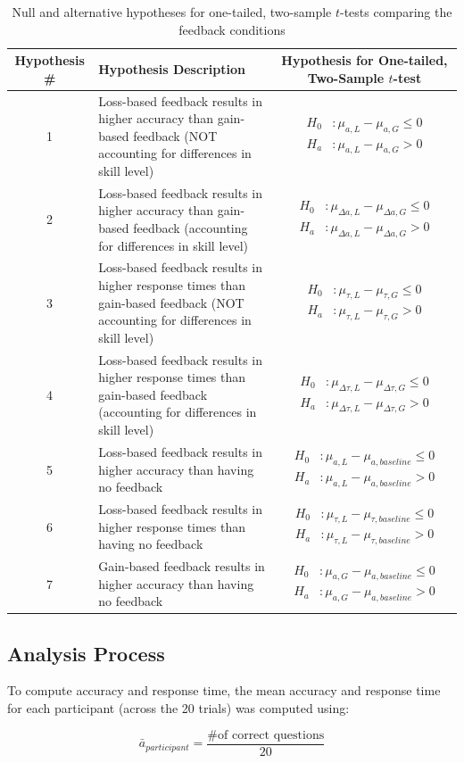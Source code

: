 \documentclass[12pt]{exam}
\newcommand{\onesidedhyp}[1]{
\begin{matrix}
H_0 &: #1 \le 0 \\
H_a &: #1 > 0
\end{matrix}
}
\begin{document}
\begin{table}[H]
    \centering
    \caption{Null and alternative hypotheses for one-tailed, two-sample $t$-tests comparing the feedback conditions}
    \begin{tabular}{|c|p{6cm}|c|}
        \hline
        Hypothesis \# & Hypothesis Description & Hypothesis for One-tailed, Two-Sample $t$-test \\
        \hline
        1 & Loss-based feedback results in higher accuracy than gain-based feedback (NOT accounting for differences in skill level) & $\onesidedhyp{\mu_{a,L} - \mu_{a,G}}$ \\ 
        \hline
        2 & Loss-based feedback results in higher accuracy than gain-based feedback (accounting for differences in skill level) & $\onesidedhyp{\mu_{\Delta a,L} - \mu_{\Delta a,G}}$ \\ 
        \hline
        3 & Loss-based feedback results in higher response times than gain-based feedback (NOT accounting for differences in skill level) & $\onesidedhyp{\mu_{\tau,L} - \mu_{\tau,G}}$ \\ 
        \hline
        4 & Loss-based feedback results in higher response times than gain-based feedback (accounting for differences in skill level) & $\onesidedhyp{\mu_{\Delta \tau,L} - \mu_{\Delta \tau,G}}$\\ 
        \hline
        5 & Loss-based feedback results in higher accuracy than having no feedback & $\onesidedhyp{\mu_{a,L}-\mu_{a,baseline}}$\\ 
        \hline
        6 & Loss-based feedback results in higher response times than having no feedback & $\onesidedhyp{\mu_{\tau,L}-\mu_{\tau,baseline}}$\\ 
        \hline
        7 & Gain-based feedback results in higher accuracy than having no feedback & $\onesidedhyp{\mu_{a,G}-\mu_{a,baseline}}$\\ 
        \hline
    \end{tabular}
    \label{tab:hypotheses}
\end{table}

\subsection{Analysis Process}
To compute accuracy and response time, the mean accuracy and response time for each participant (across the 20 trials) was computed using:

\begin{equation}
    \label{eq:participant-accuracy}
    \bar{a}_{participant}=\frac{\text{\# of correct questions}}{20}
\end{equation}
\end{document}
